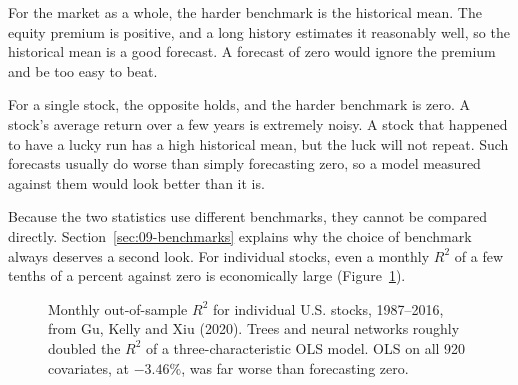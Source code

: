 For the market as a whole, the harder benchmark is the historical mean. The equity premium is positive, and a long history estimates it reasonably well, so the historical mean is a good forecast. A forecast of zero would ignore the premium and be too easy to beat.

For a single stock, the opposite holds, and the harder benchmark is zero. A stock's average return over a few years is extremely noisy. A stock that happened to have a lucky run has a high historical mean, but the luck will not repeat. Such forecasts usually do worse than simply forecasting zero, so a model measured against them would look better than it is.

Because the two statistics use different benchmarks, they cannot be compared directly. Section~\ref{sec:09-benchmarks} explains why the choice of benchmark always deserves a second look. For individual stocks, even a monthly $R^2$ of a few tenths of a percent against zero is economically large (Figure~\ref{fig:20-gkx}).

\begin{figure}[htbp]
\centering
{}
\caption{Monthly out-of-sample $R^2$ for individual U.S. stocks, 1987--2016, from Gu, Kelly and Xiu (2020). Trees and neural networks roughly doubled the $R^2$ of a three-characteristic OLS model. OLS on all 920 covariates, at $-3.46\%$, was far worse than forecasting zero.}
\label{fig:20-gkx}
\end{figure}

